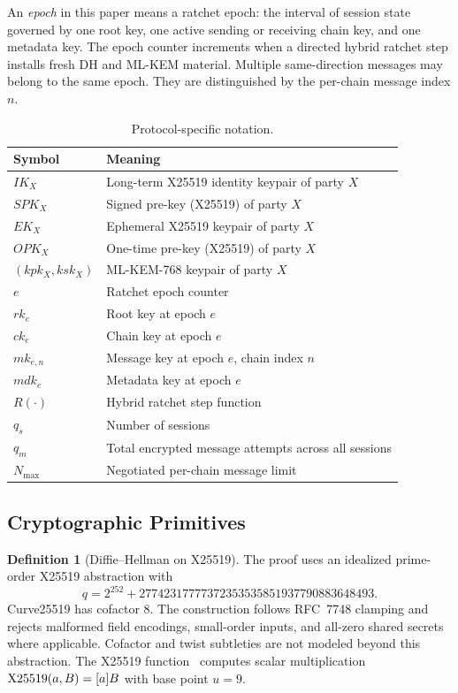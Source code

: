 \documentclass[preprint,12pt]{elsarticle}
\theoremstyle{definition}
\newtheorem{definition}[theorem]{Definition}
\newcommand{\tech}[1]{\textnormal{#1}}
\renewcommand{\DH}{\tech{X25519}}
\newcommand{\rk}{\mathit{rk}}
\newcommand{\ck}{\mathit{ck}}
\newcommand{\mk}{\mathit{mk}}
\newcommand{\mdk}{\mathit{mdk}}
\newcommand{\IK}{\mathit{IK}}
\newcommand{\SPK}{\mathit{SPK}}
\newcommand{\EK}{\mathit{EK}}
\newcommand{\OPK}{\mathit{OPK}}
\begin{document}
An \emph{epoch} in this paper means a ratchet epoch: the interval of session
state governed by one root key, one active sending or receiving chain key, and
one metadata key. The epoch counter increments when a directed hybrid ratchet
step installs fresh DH and ML-KEM material. Multiple same-direction messages may
belong to the same epoch. They are distinguished by the per-chain message
index $n$.

\begin{table}[tbp]
\centering
\caption{Protocol-specific notation.}\label{tab:notation}
\small
\begin{tabularx}{\textwidth}{@{}L{2.4cm}X@{}}
\toprule
Symbol & Meaning \\
\midrule
$\IK_X$ & Long-term X25519 identity keypair of party $X$ \\
$\SPK_X$ & Signed pre-key (X25519) of party $X$ \\
$\EK_X$ & Ephemeral X25519 keypair of party $X$ \\
$\OPK_X$ & One-time pre-key (X25519) of party $X$ \\
$(kpk_X, ksk_X)$ & ML-KEM-768 keypair of party $X$ \\
$e$ & Ratchet epoch counter \\
$\rk_e$ & Root key at epoch $e$ \\
$\ck_e$ & Chain key at epoch $e$ \\
$\mk_{e,n}$ & Message key at epoch $e$, chain index $n$ \\
$\mdk_e$ & Metadata key at epoch $e$ \\
$R(\cdot)$ & Hybrid ratchet step function \\
$q_s$ & Number of sessions \\
$q_m$ & Total encrypted message attempts across all sessions \\
$N_{\max}$ & Negotiated per-chain message limit \\
\bottomrule
\end{tabularx}
\end{table}

\subsection{Cryptographic Primitives}

\begin{definition}[Diffie--Hellman on X25519]\label{def:dh}
The proof uses an idealized prime-order X25519 abstraction with
\[
  q = 2^{252} + 27742317777372353535851937790883648493 .
\]
Curve25519 has cofactor 8. The construction follows RFC~7748 clamping and rejects malformed
field encodings, small-order inputs, and all-zero shared secrets where
applicable. Cofactor and twist subtleties are not modeled beyond this
abstraction. The X25519 function~\cite{rfc7748} computes scalar multiplication
$\DH(a, B) = [a]B$ with base point $u = 9$.
\end{definition}
\end{document}
